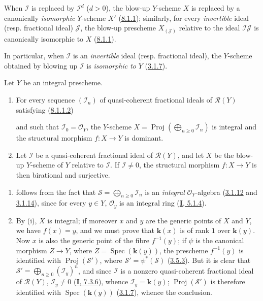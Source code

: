 When $\mathcal{I}$ is replaced by $\mathcal{I}^d$ ($d>0$), the blow-up
$Y$-scheme $X$ is replaced by a canonically \emph{isomorphic} $Y$-scheme $X'$
(\hyperref[II.8.1.1]{8.1.1}); similarly, for every \emph{invertible} ideal (resp.
fractional ideal) $\mathcal{J}$, the blow-up prescheme
$X_{(\mathcal{J})}$ relative to the ideal $\mathcal{I}\mathcal{J}$ is
canonically isomorphic to $X$ (\hyperref[II.8.1.1]{8.1.1}).

In particular, when $\mathcal{I}$ is an \emph{invertible} ideal (resp.
fractional ideal), the $Y$-scheme obtained by blowing up
$\mathcal{I}$ is \emph{isomorphic to} $Y$ (\hyperref[II.3.1.7]{3.1.7}).

\begin{proposition}[8.1.4]
\label{II.8.1.4}
Let $Y$ be an integral prescheme.
\begin{enumerate}
\item[\rm(i)] For every sequence $(\mathcal{I}_n)$ of quasi-coherent fractional
ideals of $\mathcal{R}(Y)$ satisfying
\textup{(\hyperref[II.8.1.1.2]{8.1.1.2})}

and such that $\mathcal{I}_0=\mathcal{O}_Y$, the $Y$-scheme
$X=\operatorname{Proj}(\bigoplus_{n\geq0}\mathcal{I}_n)$ is integral and the
structural morphism $f:X\to Y$ is dominant.
\item[\rm(ii)] Let $\mathcal{I}$ be a quasi-coherent fractional ideal of
$\mathcal{R}(Y)$, and let $X$ be the blow-up $Y$-scheme of $Y$ relative to
$\mathcal{I}$. If $\mathcal{I}\neq0$, the structural morphism $f:X\to Y$ is
then birational and surjective.
\end{enumerate}
\end{proposition}

\begin{enumerate}
\item[\rm(i)] follows from the fact that $\mathcal{S}=\bigoplus_{n\geq0}\mathcal{I}_n$
is an \emph{integral} $\mathcal{O}_Y$-algebra
(\hyperref[II.3.1.12]{3.1.12} and \hyperref[II.3.1.14]{3.1.14}), since
for every $y\in Y$, $\mathcal{O}_y$ is an integral ring
(\hyperref[I.5.1.4]{\textbf{I}, 5.1.4}).
\item[\rm(ii)] By (i), $X$ is integral; if moreover $x$ and $y$ are the
generic points of $X$ and $Y$, we have $f(x)=y$, and we must prove that $\boldsymbol{k}(x)$
is of rank $1$ over $\boldsymbol{k}(y)$. Now $x$ is also the generic point of the fibre
$f^{-1}(y)$; if $\psi$ is the canonical morphism $Z\to Y$, where
$Z=\operatorname{Spec}(\boldsymbol{k}(y))$, the prescheme $f^{-1}(y)$ is identified with
$\operatorname{Proj}(\mathcal{S}')$, where
$\mathcal{S}'=\psi^*(\mathcal{S})$ (\hyperref[II.3.5.3]{3.5.3}). But it is
clear that $\mathcal{S}'=\bigoplus_{n\geq0}(\mathcal{I}_y)^n$, and since
$\mathcal{I}$ is a nonzero quasi-coherent fractional ideal of
$\mathcal{R}(Y)$, $\mathcal{I}_y\neq0$
(\hyperref[I.7.3.6]{\textbf{I}, 7.3.6}), whence $\mathcal{I}_y=\boldsymbol{k}(y)$;
$\operatorname{Proj}(\mathcal{S}')$ is therefore identified with
$\operatorname{Spec}(\boldsymbol{k}(y))$ (\hyperref[II.3.1.7]{3.1.7}), whence the
conclusion.
\end{enumerate}

